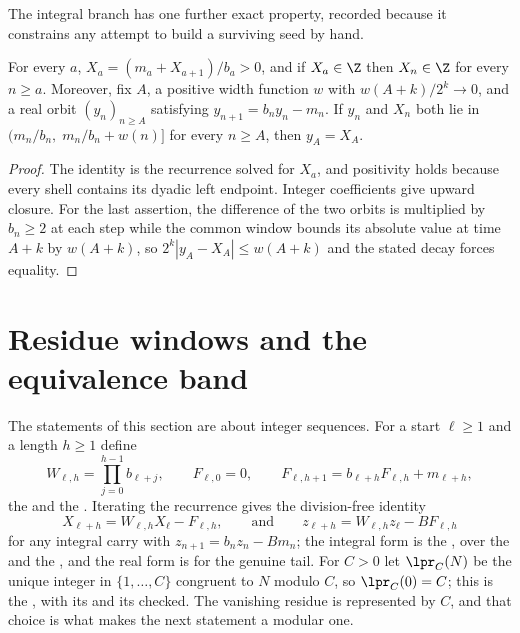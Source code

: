 The integral branch has one further exact property, recorded because it
constrains any attempt to build a surviving seed by hand.

\begin{proposition}\label{long269:res:pinning}
For every $a$, $X_a=(m_a+X_{a+1})/b_a>0$, and if $X_a\in\Z$ then $X_n\in\Z$ for
every $n\ge a$.  Moreover, fix $A$, a positive width function $w$ with
$w(A+k)/2^{k}\to0$, and a real orbit $(y_n)_{n\ge A}$ satisfying
$y_{n+1}=b_ny_n-m_n$.  If $y_n$ and $X_n$ both lie in
$(m_n/b_n,\;m_n/b_n+w(n)]$ for every $n\ge A$, then $y_A=X_A$.
\end{proposition}

\begin{proof}
The identity is the recurrence solved for $X_a$, and positivity holds because
every shell contains its dyadic left endpoint.  Integer coefficients give
upward closure.  For the last assertion, the difference of the two orbits is
multiplied by $b_n\ge2$ at each step while the common window bounds its
absolute value at time $A+k$ by $w(A+k)$, so $2^{k}|y_A-X_A|\le w(A+k)$ and the
stated decay forces equality.
\end{proof}

\section{Residue windows and the equivalence band}\label{long269:sec:escape}

The statements of this section are about integer sequences.  For a start
$\ell\ge1$ and a length $h\ge1$ define
\[
 W_{\ell,h}=\prod_{j=0}^{h-1}b_{\ell+j},
 \qquad
 F_{\ell,0}=0,
 \qquad
 F_{\ell,h+1}=b_{\ell+h}F_{\ell,h}+m_{\ell+h},
\]
the
 and the
.
Iterating the recurrence gives the division-free identity
\begin{equation}\label{long269:eq:window-identity}
 X_{\ell+h}=W_{\ell,h}X_\ell-F_{\ell,h},
 \qquad\text{and}\qquad
 z_{\ell+h}=W_{\ell,h}z_\ell-BF_{\ell,h}
\end{equation}
for any integral carry with $z_{n+1}=b_nz_n-Bm_n$; the integral form is the
, over the
 and the
, and the real form is
for the genuine tail.  For $C>0$ let $\lpr_C(N)$ be the unique integer in
$\{1,\ldots,C\}$ congruent to $N$ modulo $C$, so $\lpr_C(0)=C$; this is the
, with its
 and
its
checked.  The vanishing residue is represented by $C$, and that choice is what
makes the next statement a modular one.

